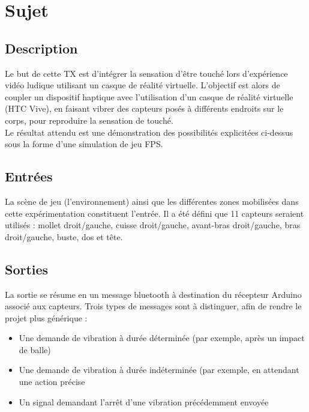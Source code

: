 \chapter{Sujet} 
\label{ch:sujet}

\section{Description}

Le but de cette TX est d'intégrer la sensation d’être touché lors d’expérience vidéo ludique utilisant un casque de réalité virtuelle. L'objectif est alors de coupler un dispositif haptique avec l'utilisation d'un casque de réalité virtuelle (HTC Vive), en faisant vibrer des capteurs posés à différents endroits sur le corps, pour reproduire la sensation de touché. \\
Le résultat attendu est une démonstration des possibilités explicitées ci-dessus sous la forme d'une simulation de jeu FPS.

\section{Entrées}

La scène de jeu (l'environnement) ainsi que les différentes zones mobilisées dans cette expérimentation constituent l'entrée. Il a été défini que 11 capteurs seraient utilisés : mollet droit/gauche, cuisse droit/gauche, avant-bras droit/gauche, bras droit/gauche, buste, dos et tête.

\section{Sorties}

La sortie se résume en un message bluetooth à destination du récepteur Arduino associé aux capteurs. Trois types de messages sont à distinguer, afin de rendre le projet plus générique : 
\begin{itemize}
	\item Une demande de vibration à durée déterminée (par exemple, après un impact de balle)
	\item Une demande de vibration à durée indéterminée (par exemple, en attendant une action précise
	\item Un signal demandant l'arrêt d'une vibration précédemment envoyée
\end{itemize}
